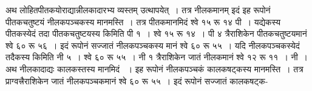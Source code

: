 \documentclass[11pt, openany]{book}
\begin{document}
\begin{sloppypar}
अथ लोहितपीतकयोराद्यान्नीलकादारभ्य व्यस्तम् उत्थापयेत्~। तत्र नीलकमानम् इदं \; इह रूपोनं पीतकचतुष्टयं नीलकपञ्चकस्य मानमस्ति~। तत्र पीतकमानमिदं श्वे १५ रू १४ पी~। यद्येकस्य पीतकस्येदं तदा पीतकचतुष्टयस्य किमिति पी १~। श्वे १५ रू १४~। पी ४ त्रैराशिकेन पीतकचतुष्टयमानं श्वे ६० रू ५६~। इदं रूपोनं सज्जातं नीलकपञ्चकस्य मानं श्वे ६० रू ५५~। यदि नीलकपञ्चकस्येदं तदैकस्य किमिति नी ५~। श्वे ६० रू ५५~। नी १ त्रैराशिकेन जातं नीलकमानं श्वे १२ रू ११~। नी~। अथ नीलकादाद्यः कालकस्तस्य मानमिदं ~। इह रूपोनं नीलकपञ्चकं कालकषट्कस्य मानमस्ति~। तत्र प्राग्वत्त्रैराशिकेन जातं नीलकपञ्चकमानं श्वे ६० रू ५५~। इदं रूपोनं सज्जातं कालकषट्क-
\end{sloppypar}

\newpage
\end{document}
